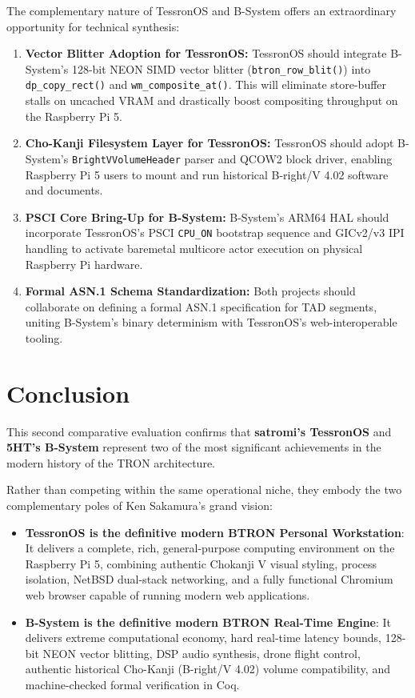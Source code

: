 \documentclass[10pt,journal,compsoc,twocolumn]{article}
\begin{document}
The complementary nature of TessronOS and B-System offers an extraordinary opportunity for technical synthesis:
\begin{enumerate}[leftmargin=*]
    \item \textbf{Vector Blitter Adoption for TessronOS:} TessronOS should integrate B-System's 128-bit NEON SIMD vector blitter (\texttt{btron\_row\_blit()}) into \texttt{dp\_copy\_rect()} and \texttt{wm\_composite\_at()}. This will eliminate store-buffer stalls on uncached VRAM and drastically boost compositing throughput on the Raspberry Pi 5.
    \item \textbf{Cho-Kanji Filesystem Layer for TessronOS:} TessronOS should adopt B-System's \texttt{BrightVVolumeHeader} parser and QCOW2 block driver, enabling Raspberry Pi 5 users to mount and run historical B-right/V 4.02 software and documents.
    \item \textbf{PSCI Core Bring-Up for B-System:} B-System's ARM64 HAL should incorporate TessronOS's PSCI \texttt{CPU\_ON} bootstrap sequence and GICv2/v3 IPI handling to activate baremetal multicore actor execution on physical Raspberry Pi hardware.
    \item \textbf{Formal ASN.1 Schema Standardization:} Both projects should collaborate on defining a formal ASN.1 specification for TAD segments, uniting B-System's binary determinism with TessronOS's web-interoperable tooling.
\end{enumerate}

\section{Conclusion}
\label{sec:conclusion}

This second comparative evaluation confirms that \textbf{satromi's TessronOS} and \textbf{5HT's B-System} represent two of the most significant achievements in the modern history of the TRON architecture. 

Rather than competing within the same operational niche, they embody the two complementary poles of Ken Sakamura's grand vision:
\begin{itemize}[leftmargin=*]
    \item \textbf{TessronOS is the definitive modern BTRON Personal Workstation}: It delivers a complete, rich, general-purpose computing environment on the Raspberry Pi 5, combining authentic Chokanji V visual styling, process isolation, NetBSD dual-stack networking, and a fully functional Chromium web browser capable of running modern web applications.
    \item \textbf{B-System is the definitive modern BTRON Real-Time Engine}: It delivers extreme computational economy, hard real-time latency bounds, 128-bit NEON vector blitting, DSP audio synthesis, drone flight control, authentic historical Cho-Kanji (B-right/V 4.02) volume compatibility, and machine-checked formal verification in Coq.
\end{itemize}
\end{document}
